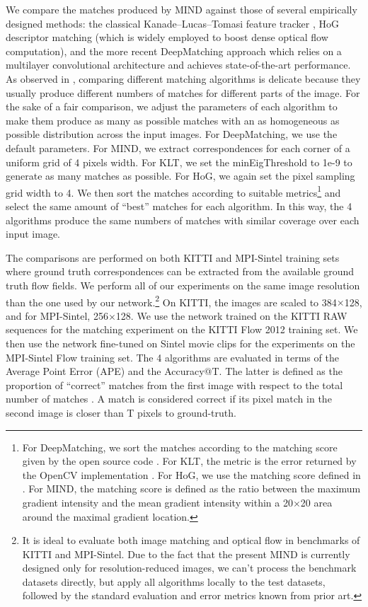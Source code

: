 \documentclass[runningheads]{llncs}
\begin{document}
	We compare the matches produced by MIND against those of several empirically designed methods: the classical Kanade--Lucas--Tomasi feature tracker \cite{bouguet2001pyramidal}, HoG descriptor matching \cite{brox11} (which is widely employed to boost dense optical flow computation), and the more recent DeepMatching approach \cite{weinzaepfel2013deepflow} which relies on a multilayer convolutional architecture and achieves state-of-the-art performance. As observed in \cite{weinzaepfel2013deepflow}, comparing different matching algorithms is delicate because they usually produce different numbers of matches for different parts of the image. For the sake of a fair comparison, we adjust the parameters of each algorithm to make them produce as many as possible matches with an as homogeneous as possible distribution across the input images. For DeepMatching, we use the default parameters. For MIND, we extract correspondences for each corner of a uniform grid of 4 pixels width. For KLT, we set the minEigThreshold to 1e-9 to generate as many matches as possible. For HoG, we again set the pixel sampling grid width to 4. We then sort the matches according to suitable metrics\footnote{For DeepMatching, we sort the matches according to the matching score given by the open source code \cite{weinzaepfel2013deepflow}. For KLT, the metric is the error returned by the OpenCV implementation \cite{bradski2008learning}. For HoG, we use the matching score defined in \cite{brox11}. For MIND, the matching score is defined as the ratio between the maximum gradient intensity and the mean gradient intensity within a 20$\times$20 area around the maximal gradient location.} and select the same amount of ``best'' matches for each algorithm. In this way, the 4 algorithms produce the same numbers of matches with similar coverage over each input image.
	
	The comparisons are performed on both KITTI \cite{Geiger2013IJRR} and MPI-Sintel \cite{Butler:ECCV:2012} training sets where ground truth correspondences can be extracted from the available ground truth flow fields. We perform all of our experiments on the same image resolution than the one used by our network.\footnote{It is ideal to evaluate both image matching and optical flow in benchmarks of KITTI and MPI-Sintel. Due to the fact that the present MIND is currently designed only for resolution-reduced images, we can't process the benchmark datasets directly, but apply all algorithms locally to the test datasets, followed by the standard evaluation and error metrics known from prior art.} On KITTI, the images are scaled to 384$\times$128, and for MPI-Sintel, 256$\times$128. We use the network trained on the KITTI RAW sequences for the matching experiment on the KITTI Flow 2012 training set. We then use the network fine-tuned on Sintel movie clips for the experiments on the MPI-Sintel Flow training set. The 4 algorithms are evaluated in terms of the Average Point Error (APE) and the Accuracy@T. The latter is defined as the proportion of ``correct'' matches from the first image with respect to the total number of matches \cite{revaud2015deep}. A match is considered correct if its pixel match in the second image is closer than T pixels to ground-truth.
	
\end{document}
